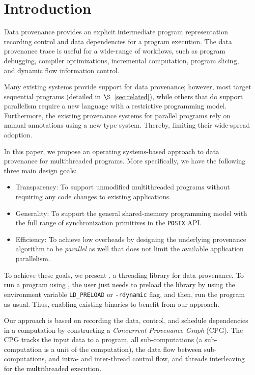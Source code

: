 \section{Introduction}
\label{sec:introduction}

Data provenance provides an explicit intermediate program representation recording control and data dependencies for a program execution.  The data provenance trace is useful for a wide-range of workflows, such as program debugging, compiler optimizations, incremental computation, program slicing, and dynamic flow information control. 

Many existing systems provide support for data provenance; however,
most target sequential programs (detailed in $\S$~\ref{sec:related}),
while others that do support parallelism require a new language with a restrictive programming model. Furthermore, the existing  provenance systems for parallel programs rely on manual annotations using a new type system. Thereby, limiting their wide-spread adoption.



In this paper, we propose an operating systems-based approach to data provenance for multithreaded programs. More specifically, we have the following three main design goals: 
\begin{itemize} 

\item Transparency: To support unmodified multithreaded programs without requiring any code changes to existing applications. 
\item Generality: To support the general shared-memory programming model with the  full range of synchronization primitives in the {\tt POSIX} API. 
\item Efficiency: To achieve low overheads by designing the underlying provenance algorithm to be  {\em parallel} as well that does not limit the available application parallelism.

\end{itemize}

To achieve these goals, we present \projecttitle, a threading library for data provenance. To run a program using \projecttitle,  the user just needs to preload the \projecttitle library  by using the environment variable {\tt LD\_PRELOAD} or {\tt -rdynamic} flag, and then, run the program as usual. Thus, enabling existing binaries to benefit from our approach. 


Our approach is based on recording the data, control, and schedule dependencies in a computation by constructing a {\em Concurrent Provenance Graph} (CPG). The CPG tracks the input data to a program, all sub-computations (a sub-computation is a unit of the computation), the data flow between sub-computations, and intra- and inter-thread control flow, and threads interleaving for the multithreaded execution.



